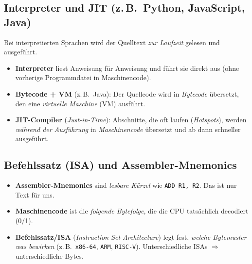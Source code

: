 \documentclass[../skript/main.tex]{subfiles}
\begin{document}
\subsection{Interpreter und JIT (z.\,B.\ Python, JavaScript, Java)}
Bei interpretierten Sprachen wird der Quelltext \emph{zur Laufzeit} gelesen und ausgeführt.
\begin{itemize}
	\item \textbf{Interpreter} liest Anweisung für Anweisung und führt sie direkt aus (ohne vorherige Programmdatei in Maschinencode).
	\item \textbf{Bytecode + VM} (z.\,B.\ Java): Der Quellcode wird in \emph{Bytecode} übersetzt, den eine \emph{virtuelle Maschine} (VM) ausführt.
	\item \textbf{JIT-Compiler} (\emph{Just-in-Time}): Abschnitte, die oft laufen (\emph{Hotspots}), werden \emph{während der Ausführung} in \emph{Maschinencode} übersetzt und ab dann schneller ausgeführt.
\end{itemize}

\subsection{Befehlssatz (ISA) und Assembler-Mnemonics}
\begin{itemize}
	\item \textbf{Assembler-Mnemonics} sind \emph{lesbare Kürzel} wie \texttt{ADD R1, R2}. Das ist nur Text für uns.
	\item \textbf{Maschinencode} ist die \emph{folgende Bytefolge}, die die CPU tatsächlich decodiert (0/1).
	\item \textbf{Befehlssatz/ISA} (\emph{Instruction Set Architecture}) legt fest, \emph{welche Byte\-muster was bewirken}
	(z.\,B.\ \texttt{x86-64}, \texttt{ARM}, \texttt{RISC-V}). Unterschiedliche ISAs \(\Rightarrow\) unterschiedliche Bytes.
\end{itemize}

\end{document}
